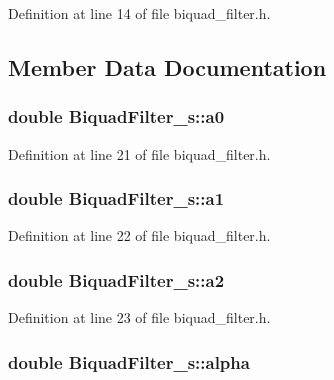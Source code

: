 Definition at line 14 of file biquad\+\_\+filter.\+h.



\subsection{Member Data Documentation}
\subsubsection[{\texorpdfstring{a0}{a0}}]{\setlength{\rightskip}{0pt plus 5cm}double Biquad\+Filter\+\_\+s\+::a0}\hypertarget{struct_biquad_filter__s_aedc2ad3a6e7ed9ceed83612bad22767d}{}\label{struct_biquad_filter__s_aedc2ad3a6e7ed9ceed83612bad22767d}


Definition at line 21 of file biquad\+\_\+filter.\+h.

\subsubsection[{\texorpdfstring{a1}{a1}}]{\setlength{\rightskip}{0pt plus 5cm}double Biquad\+Filter\+\_\+s\+::a1}\hypertarget{struct_biquad_filter__s_a3faa97cfbda027134a64893c7a2a3777}{}\label{struct_biquad_filter__s_a3faa97cfbda027134a64893c7a2a3777}


Definition at line 22 of file biquad\+\_\+filter.\+h.

\subsubsection[{\texorpdfstring{a2}{a2}}]{\setlength{\rightskip}{0pt plus 5cm}double Biquad\+Filter\+\_\+s\+::a2}\hypertarget{struct_biquad_filter__s_a0ba817d863bdeaae5d065bf72b514128}{}\label{struct_biquad_filter__s_a0ba817d863bdeaae5d065bf72b514128}


Definition at line 23 of file biquad\+\_\+filter.\+h.

\subsubsection[{\texorpdfstring{alpha}{alpha}}]{\setlength{\rightskip}{0pt plus 5cm}double Biquad\+Filter\+\_\+s\+::alpha}\hypertarget{struct_biquad_filter__s_a4b7c5d8216e48600c7f41ba07a28a19f}{}\label{struct_biquad_filter__s_a4b7c5d8216e48600c7f41ba07a28a19f}


